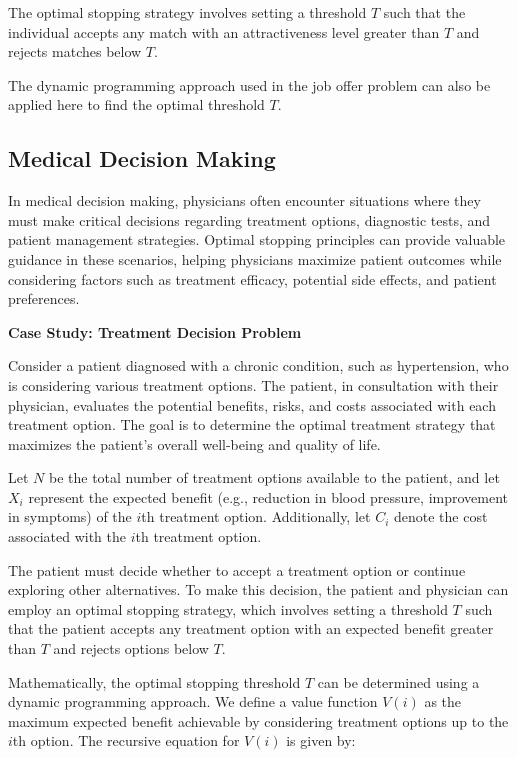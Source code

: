 \documentclass[12pt]{book} %
\begin{document}
The optimal stopping strategy involves setting a threshold \(T\) such that the individual accepts any match with an attractiveness level greater than \(T\) and rejects matches below \(T\).

The dynamic programming approach used in the job offer problem can also be applied here to find the optimal threshold \(T\).

\subsection{Medical Decision Making}

In medical decision making, physicians often encounter situations where they must make critical decisions regarding treatment options, diagnostic tests, and patient management strategies. Optimal stopping principles can provide valuable guidance in these scenarios, helping physicians maximize patient outcomes while considering factors such as treatment efficacy, potential side effects, and patient preferences.

\textbf{Case Study: Treatment Decision Problem}

Consider a patient diagnosed with a chronic condition, such as hypertension, who is considering various treatment options. The patient, in consultation with their physician, evaluates the potential benefits, risks, and costs associated with each treatment option. The goal is to determine the optimal treatment strategy that maximizes the patient's overall well-being and quality of life.

Let \(N\) be the total number of treatment options available to the patient, and let \(X_i\) represent the expected benefit (e.g., reduction in blood pressure, improvement in symptoms) of the \(i\)th treatment option. Additionally, let \(C_i\) denote the cost associated with the \(i\)th treatment option.

The patient must decide whether to accept a treatment option or continue exploring other alternatives. To make this decision, the patient and physician can employ an optimal stopping strategy, which involves setting a threshold \(T\) such that the patient accepts any treatment option with an expected benefit greater than \(T\) and rejects options below \(T\).

Mathematically, the optimal stopping threshold \(T\) can be determined using a dynamic programming approach. We define a value function \(V(i)\) as the maximum expected benefit achievable by considering treatment options up to the \(i\)th option. The recursive equation for \(V(i)\) is given by:
\end{document}
